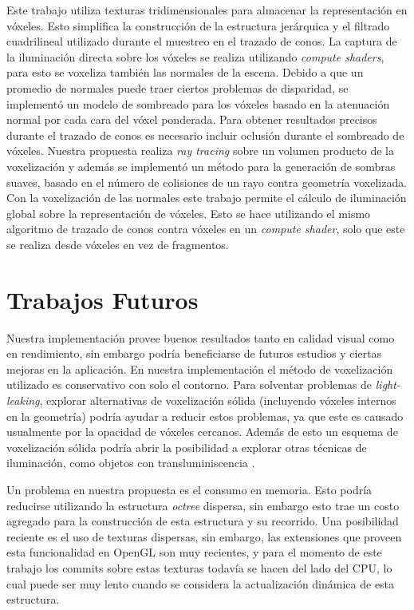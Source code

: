 Este trabajo utiliza texturas tridimensionales para almacenar la representación en vóxeles. Esto simplifica la construcción de la estructura jerárquica y el filtrado cuadrilineal utilizado durante el muestreo en el trazado de conos. La captura de la iluminación directa sobre los vóxeles se realiza utilizando \emph{compute shaders}, para esto se voxeliza también las normales de la escena. Debido a que un promedio de normales puede traer ciertos problemas de disparidad, se implementó un modelo de sombreado para los vóxeles basado en la atenuación normal por cada cara del vóxel ponderada. Para obtener resultados precisos durante el trazado de conos es necesario incluir oclusión durante el sombreado de vóxeles. Nuestra propuesta realiza \emph{ray tracing} sobre un volumen producto de la voxelización y además se implementó un método para la generación de sombras suaves, basado en el número de colisiones de un rayo contra geometría voxelizada. Con la voxelización de las normales este trabajo permite el cálculo de iluminación global sobre la representación de vóxeles. Esto se hace utilizando el mismo algoritmo de trazado de conos contra vóxeles en un \emph{compute shader}, solo que este se realiza desde vóxeles en vez de fragmentos.

\section{Trabajos Futuros} %
\label{sec:trabajos_futuros}
Nuestra implementación provee buenos resultados tanto en calidad visual como en rendimiento, sin embargo podría beneficiarse de futuros estudios y ciertas mejoras en la aplicación. En nuestra implementación el método de voxelización utilizado es conservativo con solo el contorno. Para solventar problemas de \emph{light-leaking}, explorar alternativas de voxelización sólida (incluyendo vóxeles internos en la geometría) podría ayudar a reducir estos problemas, ya que este es causado usualmente por la opacidad de vóxeles cercanos. Además de esto un esquema de voxelización sólida podría abrir la posibilidad a explorar otras técnicas de iluminación, como objetos con transluminiscencia \cite{Eisemann:2008:SGS:1375714.1375728}.

Un problema en nuestra propuesta es el consumo en memoria. Esto podría reducirse utilizando la estructura \emph{octree} dispersa, sin embargo esto trae un costo agregado para la construcción de esta estructura y su recorrido. Una posibilidad reciente es el uso de texturas dispersas, sin embargo, las extensiones que proveen esta funcionalidad en OpenGL son muy recientes, y para el momento de este trabajo los commits sobre estas texturas todavía se hacen del lado del CPU, lo cual puede ser muy lento cuando se considera la actualización dinámica de esta estructura.

